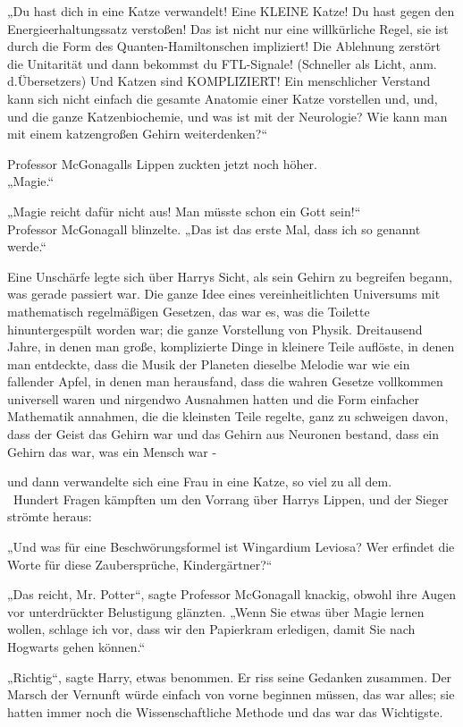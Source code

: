 {„Du hast dich in eine Katze verwandelt! Eine KLEINE Katze! Du hast gegen den Energieerhaltungssatz verstoßen! Das ist nicht nur eine willkürliche Regel, sie ist durch die Form des Quanten-Hamiltonschen impliziert! Die Ablehnung zerstört die Unitarität und dann bekommst du FTL-Signale! (Schneller als Licht, anm. d.Übersetzers) Und Katzen sind KOMPLIZIERT! Ein menschlicher Verstand kann sich nicht einfach die gesamte Anatomie einer Katze vorstellen und, und, und die ganze Katzenbiochemie, und was ist mit der Neurologie? Wie kann man mit einem katzengroßen Gehirn weiterdenken?“ ~ ~

Professor McGonagalls Lippen zuckten jetzt noch höher.\\ „Magie.“ ~ ~

„Magie reicht dafür nicht aus! Man müsste schon ein Gott sein!“ ~ ~\\ Professor McGonagall blinzelte. „Das ist das erste Mal, dass ich so genannt werde.“

Eine Unschärfe legte sich über Harrys Sicht, als sein Gehirn zu begreifen begann, was gerade passiert war. Die ganze Idee eines vereinheitlichten Universums mit mathematisch regelmäßigen Gesetzen, das war es, was die Toilette hinuntergespült worden war; die ganze Vorstellung von Physik. Dreitausend Jahre, in denen man große, komplizierte Dinge in kleinere Teile auflöste, in denen man entdeckte, dass die Musik der Planeten dieselbe Melodie war wie ein fallender Apfel, in denen man herausfand, dass die wahren Gesetze vollkommen universell waren und nirgendwo Ausnahmen hatten und die Form einfacher Mathematik annahmen, die die kleinsten Teile regelte, ganz zu schweigen davon, dass der Geist das Gehirn war und das Gehirn aus Neuronen bestand, dass ein Gehirn das war, was ein Mensch war -

und dann verwandelte sich eine Frau in eine Katze, so viel zu all dem. ~ ~Hundert Fragen kämpften um den Vorrang über Harrys Lippen, und der Sieger strömte heraus:

„Und was für eine Beschwörungsformel ist Wingardium Leviosa? Wer erfindet die Worte für diese Zaubersprüche, Kindergärtner?“ ~ ~

„Das reicht, Mr. Potter“, sagte Professor McGonagall knackig, obwohl ihre Augen vor unterdrückter Belustigung glänzten. „Wenn Sie etwas über Magie lernen wollen, schlage ich vor, dass wir den Papierkram erledigen, damit Sie nach Hogwarts gehen können.“ ~ ~

„Richtig“, sagte Harry, etwas benommen. Er riss seine Gedanken zusammen. Der Marsch der Vernunft würde einfach von vorne beginnen müssen, das war alles; sie hatten immer noch die Wissenschaftliche Methode und das war das Wichtigste.

}
